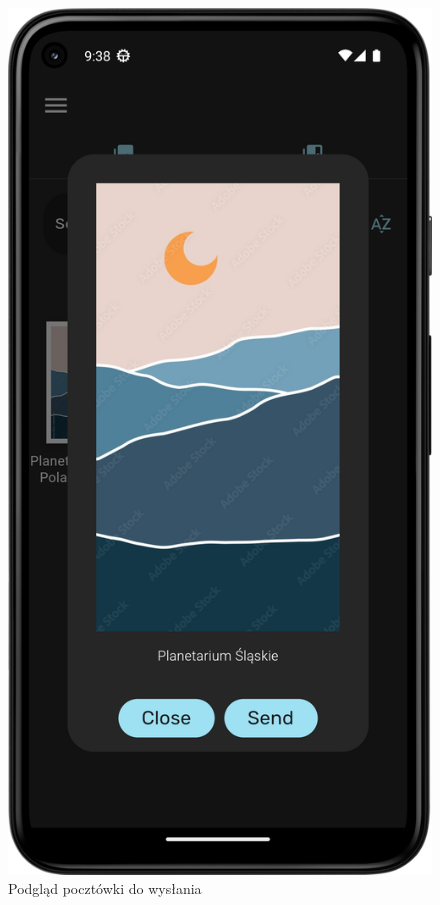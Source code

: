 \documentclass[a4paper,twoside,12pt]{book}
\begin{document}
\begin{figure}[H]
\begin{minipage}[b]{0.49\textwidth}
    \includegraphics[width=\textwidth]{mobile_ss/pocztowki_podglad.png}
    \caption{Podgląd pocztówki do wysłania}
  \end{minipage}
\end{figure}
\end{document}
